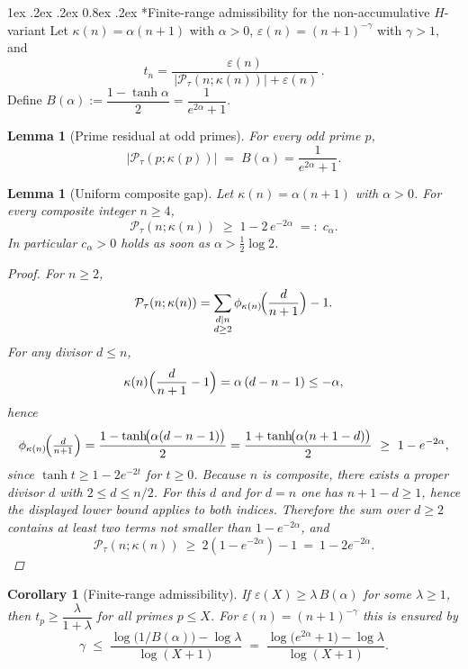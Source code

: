 \documentclass[11pt,a4paper]{amsart}
\makeatletter
\renewcommand\paragraph{\@startsection{paragraph}{4}{\z@}%
  {1ex \@plus .2ex \@minus .2ex}%
  {0.8ex \@plus .2ex}%
  {\normalfont\bfseries}}
\theoremstyle{plain}
\newtheorem{lemma}[theorem]{Lemma}
\newtheorem{corollary}[theorem]{Corollary}
\theoremstyle{definition}
\theoremstyle{remark}
\makeatother
\begin{document}
\paragraph*{Finite-range admissibility for the non-accumulative $H$-variant}
Let $\kappa(n)=\alpha(n+1)$ with $\alpha>0$, $\varepsilon(n)=(n+1)^{-\gamma}$ with $\gamma>1$, and
\[
t_n=\frac{\varepsilon(n)}{\,|\mathcal P_\tau(n;\kappa(n))|+\varepsilon(n)}\,.
\]
Define $B(\alpha):=\dfrac{1-\tanh\alpha}{2}=\dfrac{1}{e^{2\alpha}+1}$.

\begin{lemma}[Prime residual at odd primes]
For every odd prime $p$,
\[
\bigl|\mathcal P_\tau(p;\kappa(p))\bigr| \;=\; B(\alpha)=\frac{1}{e^{2\alpha}+1}.
\]
\end{lemma}

\begin{lemma}[Uniform composite gap]\label{lem:uniform-composite-gap}
Let $\kappa(n)=\alpha(n+1)$ with $\alpha>0$. For every composite integer $n\ge 4$,
\[
\mathcal P_\tau(n;\kappa(n))\;\ge\; 1-2\,e^{-2\alpha}\;=:\;c_\alpha.
\]
In particular $c_\alpha>0$ holds as soon as $\alpha>\tfrac12\log 2$.

\begin{proof}
For $n\ge 2$,
\[
\mathcal P_\tau(n;\kappa(n))=\sum_{\substack{d\mid n\\ d\ge 2}}\phi_{\kappa(n)}\!\Bigl(\frac{d}{n+1}\Bigr)-1.
\]
For any divisor $d\le n$,
\[
\kappa(n)\Bigl(\frac{d}{n+1}-1\Bigr)=\alpha\,(d-n-1)\le -\alpha,
\]
hence
\[
\phi_{\kappa(n)}\!\Bigl(\tfrac{d}{n+1}\Bigr)
=\frac{1-\tanh\!\bigl(\alpha(d-n-1)\bigr)}{2}
=\frac{1+\tanh\!\bigl(\alpha(n+1-d)\bigr)}{2}
\ \ge\ 1-e^{-2\alpha},
\]
since $\tanh t\ge 1-2e^{-2t}$ for $t\ge 0$. Because $n$ is composite, there exists a proper divisor $d$ with $2\le d\le n/2$. For this $d$ and for $d=n$ one has $n+1-d\ge 1$, hence the displayed lower bound applies to both indices. Therefore the sum over $d\ge 2$ contains at least two terms not smaller than $1-e^{-2\alpha}$, and
\[
\mathcal P_\tau(n;\kappa(n))
\ \ge\ 2(1-e^{-2\alpha})-1
\ =\ 1-2e^{-2\alpha}.
\]
\end{proof}
\end{lemma}


\begin{corollary}[Finite-range admissibility]
If $\varepsilon(X)\ge \lambda\,B(\alpha)$ for some $\lambda\ge 1$, then $t_p\ge \dfrac{\lambda}{1+\lambda}$ for all primes $p\le X$.
For $\varepsilon(n)=(n+1)^{-\gamma}$ this is ensured by
\[
\gamma \;\le\; \frac{\log\!\bigl(1/B(\alpha)\bigr)-\log \lambda}{\log(X+1)}
 \;=\; \frac{\log\!\bigl(e^{2\alpha}+1\bigr)-\log \lambda}{\log(X+1)}.
\]
\end{corollary}
\end{document}
